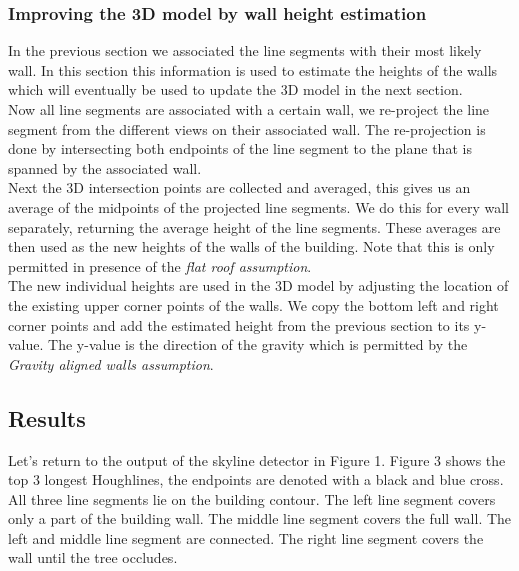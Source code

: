 \documentclass[10pt]{article}
\begin{document}





\subsubsection{Improving the 3D model by wall height estimation}
	In the previous section we associated the line segments with their most
	likely wall. In this section this information is used to estimate the
	heights of the walls which will eventually be used to update the 3D model in the
	next section. \\
	Now all line segments are associated with a certain wall, we re-project the
	line segment from the different views on their associated wall. The
	re-projection is done by intersecting both endpoints of the line segment to
	the plane that is spanned by the associated wall.\\
	Next the 3D intersection points are collected and averaged, this gives us
	an average of the midpoints of the projected line segments. We do this for
	every wall separately, returning the average height of the line segments.
	These averages are then used as the new heights of the walls of the
	building. Note that this is only permitted in presence of the \emph{flat roof assumption}.\\
	The new individual heights are used in the 3D model by adjusting the
	location of the existing upper corner points of the walls. We copy the
	bottom left and right corner points and add the estimated height from the
	previous section to its y-value. The y-value is the direction of the
	gravity which is permitted by the \emph{Gravity aligned walls assumption}.

\subsection{Results}
\noindent
{}
Let's return to the output of the skyline detector in Figure 1.
Figure 3
shows the top 3 longest Houghlines, the
endpoints are denoted with a black and blue cross. All three line segments lie on the
building contour.  The left line segment covers only a part of the building wall. The
middle line segment covers the full wall. The left and middle line segment are connected. The
right line segment covers the wall until the tree occludes.\\
\end{document}
